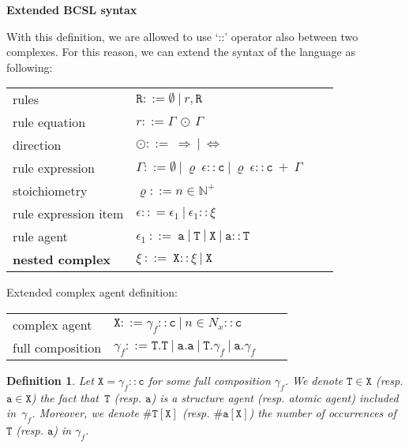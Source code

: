 \documentclass[12pt]{article}
\newtheorem{mydef}{Definition}
\newcommand{\mysection}[1]{{\newpage\centering\Large\textbf{#1}\\}\normalsize\vspace{0.5cm}}
\begin{document}
\mysection{Extended BCSL syntax}

With this definition, we are allowed to use `::' operator also between two complexes. For this reason, we can extend the syntax of the language as following:

\begin{center}
{\small
\hspace*{-1cm}\begin{tabular}{ ll ll }
 rules& $\mathtt{R} ::= \emptyset ~|~ r, \mathtt{R} $\\
 rule equation & $r ::= \Gamma ~\odot~\Gamma$\\
 direction & $\odot ::=~ \Rightarrow~|~\Leftrightarrow $\\
 rule expression & $\Gamma ::= \emptyset~|~\varrho~\epsilon::\mathtt{c}~|~ \varrho~\epsilon::\mathtt{c}~ +~\Gamma$\\
 stoichiometry & $\varrho ::= n \in \mathbb{N}^+$\\
 rule expression item & $\epsilon :: = \epsilon_1~|~\epsilon_1::\xi$\\
 rule agent & $\epsilon_1  ~::=~  \mathtt{a}~|~\mathtt{T}~|~\mathtt{X}~|~\mathtt{a}::\mathtt{T}$\\
 \textbf{nested complex} & $\xi  ~::=~  \mathtt{X}::\xi~|~\mathtt{X}$
\end{tabular}
}
\end{center}

Extended complex agent definition:

\begin{center}
{\small
\hspace*{-1cm}\begin{tabular}{ ll ll }
 complex agent & $\mathtt{X}::=\gamma_f::\mathtt{c}~|~n\in{N}_{x}::\mathtt{c}$\\
 full composition & $\gamma_f ::= \mathtt{T}.\mathtt{T}~|~\mathtt{a}.\mathtt{a}~|~\mathtt{T}.\gamma_{f}~|~\mathtt{a}.\gamma_{f}$

\end{tabular}
}
\end{center}

\begin{mydef}
Let $\mathtt{X}=\gamma_f::\mathtt{c}$ for some full composition $\gamma_f$. We denote $\mathtt{T}\in \mathtt{X}$ (resp. $\mathtt{a}\in \mathtt{X}$) the fact that~$\mathtt{T}$ (resp. $\mathtt{a}$) is a structure agent (resp. atomic agent) included in~$\gamma_f$. 
Moreover, we denote $\#\mathtt{T}[\mathtt{X}]$ (resp. $\#\mathtt{a}[\mathtt{X}]$) the number of occurrences of~$\mathtt{T}$ (resp. $\mathtt{a}$) in $\gamma_f$. 
\end{mydef}
\end{document}
